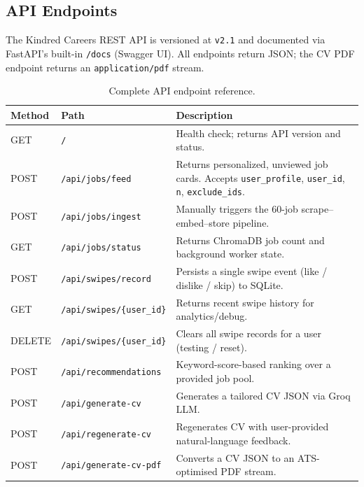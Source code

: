 \documentclass[12pt, a4paper, oneside]{report}
\begin{document}
\subsection{API Endpoints}
\label{sec:api-endpoints}

The Kindred Careers REST API is versioned at \texttt{v2.1} and documented via
FastAPI's built-in \texttt{/docs} (Swagger UI). All endpoints return JSON; the CV PDF
endpoint returns an \texttt{application/pdf} stream.

\begin{table}[H]
  \centering
  \caption{Complete API endpoint reference.}
  \label{tab:api-endpoints}
  \renewcommand{\arraystretch}{1.35}
  \begin{tabularx}{\textwidth}{@{} l l X @{}}
    \toprule
    \textbf{Method} & \textbf{Path}             & \textbf{Description} \\
    \midrule
    GET   & \texttt{/}                        & Health check; returns API version and status. \\
    \midrule
    POST  & \texttt{/api/jobs/feed}           & Returns personalized, unviewed job cards. Accepts \texttt{user\_profile}, \texttt{user\_id}, \texttt{n}, \texttt{exclude\_ids}. \\
    POST  & \texttt{/api/jobs/ingest}         & Manually triggers the 60-job scrape–embed–store pipeline. \\
    GET   & \texttt{/api/jobs/status}         & Returns ChromaDB job count and background worker state. \\
    \midrule
    POST  & \texttt{/api/swipes/record}       & Persists a single swipe event (like / dislike / skip) to SQLite. \\
    GET   & \texttt{/api/swipes/\{user\_id\}} & Returns recent swipe history for analytics/debug. \\
    DELETE& \texttt{/api/swipes/\{user\_id\}} & Clears all swipe records for a user (testing / reset). \\
    \midrule
    POST  & \texttt{/api/recommendations}     & Keyword-score-based ranking over a provided job pool. \\
    POST  & \texttt{/api/generate-cv}         & Generates a tailored CV JSON via Groq LLM. \\
    POST  & \texttt{/api/regenerate-cv}       & Regenerates CV with user-provided natural-language feedback. \\
    POST  & \texttt{/api/generate-cv-pdf}     & Converts a CV JSON to an ATS-optimised PDF stream. \\
    \bottomrule
  \end{tabularx}
\end{table}
\end{document}
